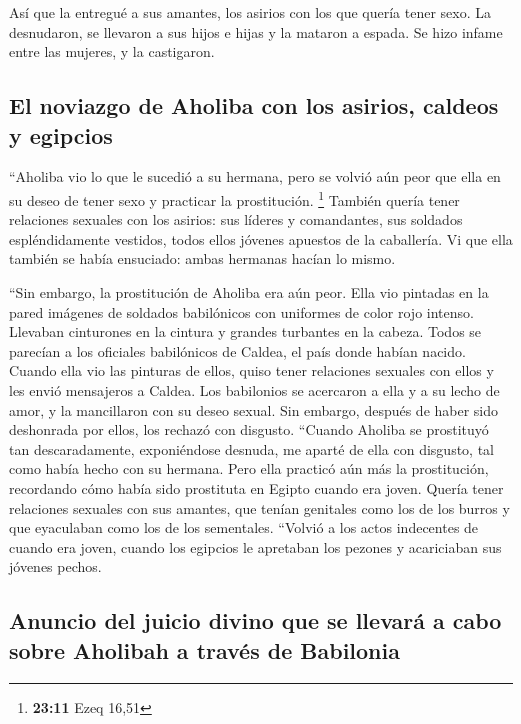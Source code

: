  Así que la entregué a sus amantes, los asirios con los
que quería tener sexo.  La desnudaron, se llevaron a sus
hijos e hijas y la mataron a espada. Se hizo infame entre las mujeres, y
la castigaron.

\hypertarget{el-noviazgo-de-aholiba-con-los-asirios-caldeos-y-egipcios}{%
\subsection{El noviazgo de Aholiba con los asirios, caldeos y
egipcios}\label{el-noviazgo-de-aholiba-con-los-asirios-caldeos-y-egipcios}}

 ``Aholiba vio lo que le sucedió a su hermana, pero se
volvió aún peor que ella en su deseo de tener sexo y practicar la
prostitución. \footnote{\textbf{23:11} Ezeq 16,51} 
También quería tener relaciones sexuales con los asirios: sus líderes y
comandantes, sus soldados espléndidamente vestidos, todos ellos jóvenes
apuestos de la caballería.  Vi que ella también se había
ensuciado: ambas hermanas hacían lo mismo.

 ``Sin embargo, la prostitución de Aholiba era aún peor.
Ella vio pintadas en la pared imágenes de soldados babilónicos con
uniformes de color rojo intenso.  Llevaban cinturones en
la cintura y grandes turbantes en la cabeza. Todos se parecían a los
oficiales babilónicos de Caldea, el país donde habían nacido.
 Cuando ella vio las pinturas de ellos, quiso tener
relaciones sexuales con ellos y les envió mensajeros a Caldea.
 Los babilonios se acercaron a ella y a su lecho de amor,
y la mancillaron con su deseo sexual. Sin embargo, después de haber sido
deshonrada por ellos, los rechazó con disgusto.  ``Cuando
Aholiba se prostituyó tan descaradamente, exponiéndose desnuda, me
aparté de ella con disgusto, tal como había hecho con su hermana.
 Pero ella practicó aún más la prostitución, recordando
cómo había sido prostituta en Egipto cuando era joven. 
Quería tener relaciones sexuales con sus amantes, que tenían genitales
como los de los burros y que eyaculaban como los de los sementales.
 ``Volvió a los actos indecentes de cuando era joven,
cuando los egipcios le apretaban los pezones y acariciaban sus jóvenes
pechos.

\hypertarget{anuncio-del-juicio-divino-que-se-llevaruxe1-a-cabo-sobre-aholibah-a-travuxe9s-de-babilonia}{%
\subsection{Anuncio del juicio divino que se llevará a cabo sobre
Aholibah a través de
Babilonia}\label{anuncio-del-juicio-divino-que-se-llevaruxe1-a-cabo-sobre-aholibah-a-travuxe9s-de-babilonia}}

